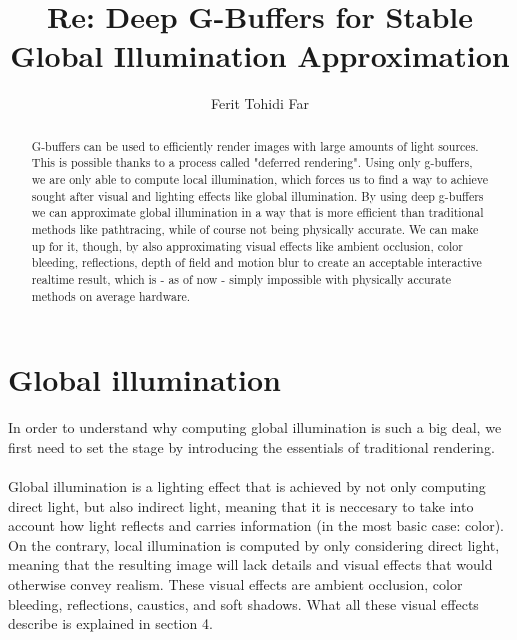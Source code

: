 \documentclass{ACGSeminar}
\begin{document}
\title{Re: Deep G-Buffers for Stable Global Illumination Approximation}

\author{Ferit Tohidi Far}

\maketitle


\begin{abstract}%
G-buffers can be used to efficiently render images with large amounts of light sources. This is possible thanks to a process called "deferred rendering". Using 
only g-buffers, we are only able to compute local illumination, which forces us to find a way to achieve sought after visual and lighting effects like global 
illumination. By using deep g-buffers we can approximate global illumination in a way that is more efficient than traditional methods like pathtracing, 
while of course not being physically accurate. We can make up for it, though, by also approximating visual effects like ambient occlusion, color bleeding, reflections, 
depth of field and motion blur to create an acceptable interactive realtime result, which is - as of now - simply impossible with physically accurate methods on 
average hardware.
\end{abstract}

\tableofcontents
\listoffigures
\listofalgorithms

\label{cha:references}

\newpage

\label{cha:introduction}
\section{Global illumination}
	In order to understand why computing global illumination is such a big deal, we first need to set the stage by introducing the essentials of traditional rendering. \\\\
	Global illumination is a lighting effect that is achieved by not only computing direct light, but also indirect light, meaning that it is neccesary to take	into account how light reflects and carries information (in the most basic case: color). On the contrary, local illumination is computed by only considering direct light, meaning that the resulting image will lack details and visual effects that would otherwise convey realism. These visual effects are ambient occlusion, color bleeding, reflections, caustics, and soft shadows. What all these visual effects describe is explained in section 4.
\end{document}
